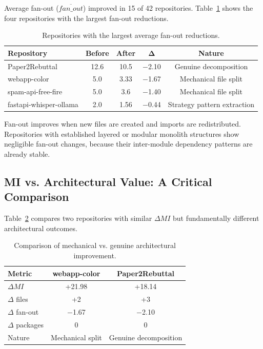 Average fan-out ($\overline{fan\_out}$) improved in 15 of 42 repositories. Table~\ref{tab:arch_fanout} shows the four repositories with the largest fan-out reductions.

\begin{table}[H]
\centering
\small
\caption{Repositories with the largest average fan-out reductions.}
\label{tab:arch_fanout}
\begin{tabular}{lcccc}
\toprule
\textbf{Repository} & \textbf{Before} & \textbf{After} & $\mathbf{\Delta}$ & \textbf{Nature} \\
\midrule
Paper2Rebuttal & 12.6 & 10.5 & $-$2.10 & Genuine decomposition \\
webapp-color & 5.0 & 3.33 & $-$1.67 & Mechanical file split \\
spam-api-free-fire & 5.0 & 3.6 & $-$1.40 & Mechanical file split \\
fastapi-whisper-ollama & 2.0 & 1.56 & $-$0.44 & Strategy pattern extraction \\
\bottomrule
\end{tabular}
\end{table}

Fan-out improves when new files are created and imports are redistributed. Repositories with established layered or modular monolith structures show negligible fan-out changes, because their inter-module dependency patterns are already stable.

\subsection{MI vs. Architectural Value: A Critical Comparison}

Table~\ref{tab:arch_mi_vs_arch} compares two repositories with similar $\Delta MI$ but fundamentally different architectural outcomes.

\begin{table}[H]
\centering
\small
\caption{Comparison of mechanical vs. genuine architectural improvement.}
\label{tab:arch_mi_vs_arch}
\begin{tabular}{lcc}
\toprule
\textbf{Metric} & \textbf{webapp-color} & \textbf{Paper2Rebuttal} \\
\midrule
$\Delta MI$ & +21.98 & +18.14 \\
$\Delta$ files & +2 & +3 \\
$\Delta$ fan-out & $-$1.67 & $-$2.10 \\
$\Delta$ packages & 0 & 0 \\
Nature & Mechanical split & Genuine decomposition \\
\bottomrule
\end{tabular}
\end{table}

